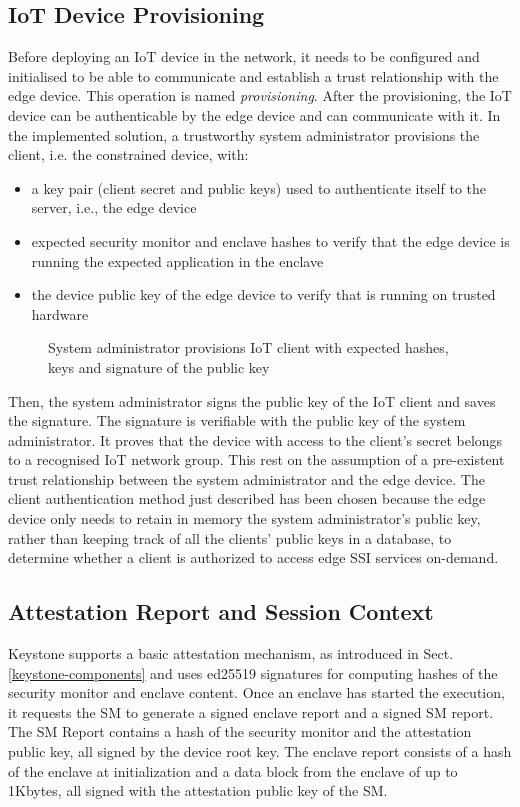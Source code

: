 \subsection{IoT Device Provisioning}
\label{sect:provisioning}
Before deploying an IoT device in the network, it needs to be configured and initialised to be able to communicate and establish a trust relationship with the edge device. This operation is named \textit{provisioning}. 
After the provisioning, the IoT device can be authenticable by the edge device and can communicate with it. 
In the implemented solution, a trustworthy system administrator provisions the client, i.e. the constrained device, with: 
\begin{itemize}
    \item a key pair (client secret and public keys) used to authenticate itself to the server, i.e., the edge device
    \item expected security monitor and enclave hashes to verify that the edge device is running the expected application in the enclave 
    \item the device public key of the edge device to verify that is running on trusted hardware
\end{itemize} 

\begin{figure}[!h]
    \centering
    
    \caption{System administrator provisions IoT client with expected hashes, keys and signature of the public key}
    \label{manufacturer-provisioning}
\end{figure}

Then, the system administrator signs the public key of the IoT client and saves the signature. The signature is verifiable with the public key of the system administrator. It proves that the device with access to the client's secret belongs to a recognised IoT network group. This rest on the assumption of a pre-existent trust relationship between the system administrator and the edge device. The client authentication method just described has been chosen because the edge device only needs to retain in memory the system administrator's public key, rather than keeping track of all the clients' public keys in a database, to determine whether a client is authorized to access edge SSI services on-demand.

\subsection{Attestation Report and Session Context}
Keystone supports a basic attestation mechanism, as introduced in Sect. \ref{keystone-components} and uses ed25519 signatures \cite{bernstein2012high} for computing hashes of the security monitor and enclave content. Once an enclave has started the execution, it requests the SM to generate a signed enclave report and a signed SM report. The SM Report contains a hash of the security monitor and the attestation public key, all signed by the device root key. The enclave report consists of a hash of the enclave at initialization and a data block from the enclave of up to 1Kbytes, all signed with the attestation public key of the SM. 

